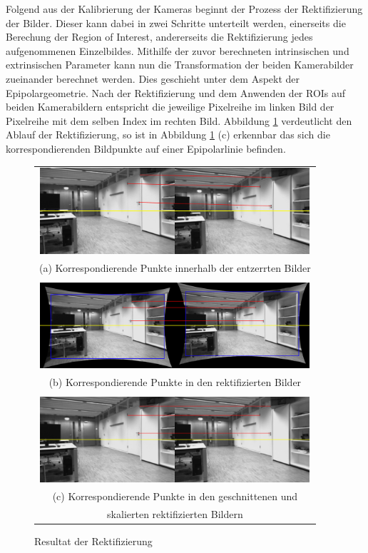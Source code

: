 \noindent
Folgend aus der Kalibrierung der Kameras beginnt der Prozess der Rektifizierung der Bilder. Dieser kann dabei in zwei Schritte unterteilt werden, einerseits die Berechung der Region of Interest, andererseits die Rektifizierung jedes aufgenommenen Einzelbildes. Mithilfe der zuvor berechneten intrinsischen und extrinsischen Parameter kann nun die Transformation der beiden Kamerabilder zueinander berechnet werden. Dies geschieht unter dem Aspekt der Epipolargeometrie. Nach der Rektifizierung und dem Anwenden der ROIs auf beiden Kamerabildern entspricht die jeweilige Pixelreihe im linken Bild der Pixelreihe mit dem selben Index im rechten Bild. Abbildung \ref{img:rectification} verdeutlicht den Ablauf der Rektifizierung, so ist in Abbildung \ref{img:rectification} (c) erkennbar das sich die korrespondierenden Bildpunkte auf einer Epipolarlinie befinden.\\

   	\pagebreak
\begin{figure}[h]
	\centering
	\begin{tabular}{c}
	\includegraphics[width=10cm]{img/calibration/undistort}\\
	\small (a) Korrespondierende Punkte innerhalb der entzerrten Bilder\\\\
	\includegraphics[width=10cm]{img/calibration/rect_uncropped.pdf}\\
	\small (b) Korrespondierende Punkte in den rektifizierten Bilder\\\\
	\includegraphics[width=10cm]{img/calibration/rect_cropped.pdf}\\
	\small (c) Korrespondierende Punkte in den geschnittenen und \\
				skalierten rektifizierten Bildern
	\end{tabular}
\caption{Resultat der Rektifizierung}
\label{img:rectification}
\end{figure}


